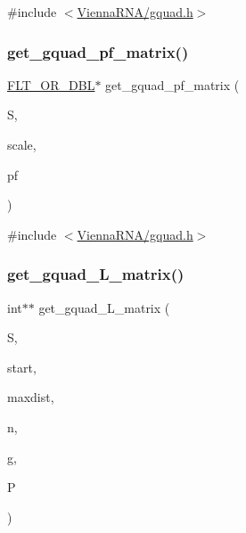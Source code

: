 {\ttfamily \#include $<$\mbox{\hyperlink{gquad_8h}{Vienna\+R\+N\+A/gquad.\+h}}$>$}

\mbox{\label{group__gquads_ga286fa5dfce69c0f383c469d4147d9634}} 
\subsubsection{\texorpdfstring{get\+\_\+gquad\+\_\+pf\+\_\+matrix()}{get\_gquad\_pf\_matrix()}}
{\footnotesize\ttfamily \mbox{\hyperlink{group__data__structures_ga31125aeace516926bf7f251f759b6126}{F\+L\+T\+\_\+\+O\+R\+\_\+\+D\+BL}}$\ast$ get\+\_\+gquad\+\_\+pf\+\_\+matrix (\begin{DoxyParamCaption}\item[{short $\ast$}]{S,  }\item[{\mbox{\hyperlink{group__data__structures_ga31125aeace516926bf7f251f759b6126}{F\+L\+T\+\_\+\+O\+R\+\_\+\+D\+BL}} $\ast$}]{scale,  }\item[{\mbox{\hyperlink{group__energy__parameters_ga01d8b92fe734df8d79a6169482c7d8d8}{vrna\+\_\+exp\+\_\+param\+\_\+t}} $\ast$}]{pf }\end{DoxyParamCaption})}



{\ttfamily \#include $<$\mbox{\hyperlink{gquad_8h}{Vienna\+R\+N\+A/gquad.\+h}}$>$}

\mbox{\label{group__gquads_gaed52d05fbe10e771daa2593d2d935937}} 
\subsubsection{\texorpdfstring{get\+\_\+gquad\+\_\+\+L\+\_\+matrix()}{get\_gquad\_L\_matrix()}}
{\footnotesize\ttfamily int$\ast$$\ast$ get\+\_\+gquad\+\_\+\+L\+\_\+matrix (\begin{DoxyParamCaption}\item[{short $\ast$}]{S,  }\item[{int}]{start,  }\item[{int}]{maxdist,  }\item[{int}]{n,  }\item[{int $\ast$$\ast$}]{g,  }\item[{\mbox{\hyperlink{group__energy__parameters_ga8a69ca7d787e4fd6079914f5343a1f35}{vrna\+\_\+param\+\_\+t}} $\ast$}]{P }\end{DoxyParamCaption})}



